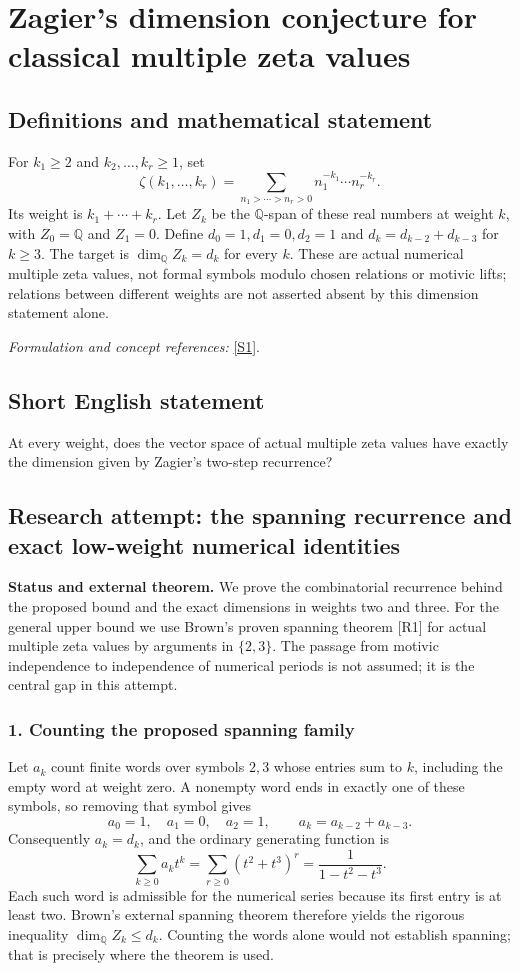 \documentclass[11pt]{article}
\begin{document}
\section*{\texorpdfstring{Zagier's dimension conjecture for classical multiple zeta values}{Zagier's dimension conjecture for classical multiple zeta values}}\label{statement}
\subsection{Definitions and mathematical statement}
For $k_1\ge2$ and $k_2,\ldots,k_r\ge1$, set
\[
 \zeta(k_1,\ldots,k_r)=\sum_{n_1>\cdots>n_r>0}
 n_1^{-k_1}\cdots n_r^{-k_r}.
\]
Its weight is $k_1+\cdots+k_r$. Let $Z_k$ be the ${\mathbb{Q}}$-span of these real numbers at weight $k$, with $Z_0={\mathbb{Q}}$ and $Z_1=0$. Define $d_0=1,d_1=0,d_2=1$ and
$d_k=d_{k-2}+d_{k-3}$ for $k\ge3$. The target is $\dim_{{\mathbb{Q}}}Z_k=d_k$ for every $k$. These are actual numerical multiple zeta values, not formal symbols modulo chosen relations or motivic lifts; relations between different weights are not asserted absent by this dimension statement alone.
\par\smallskip\textit{Formulation and concept references:} \href{https://www2.math.kyushu-u.ac.jp/~mkaneko/papers/40conjecture_dimension.pdf}{[S1]}.

\subsection{Short English statement}
At every weight, does the vector space of actual multiple zeta values have exactly the dimension given by Zagier's two-step recurrence?
\subsection{Research attempt: the spanning recurrence and exact low-weight numerical identities}
\textbf{Status and external theorem.} We prove the combinatorial recurrence behind the proposed bound and the exact dimensions in weights two and three. For the general upper bound we use Brown's proven spanning theorem [R1] for actual multiple zeta values by arguments in $\{2,3\}$. The passage from motivic independence to independence of numerical periods is not assumed; it is the central gap in this attempt.

\subsubsection{1. Counting the proposed spanning family}
Let $a_k$ count finite words over symbols $2,3$ whose entries sum to $k$, including the empty word at weight zero. A nonempty word ends in exactly one of these symbols, so removing that symbol gives
\[a_0=1,\quad a_1=0,\quad a_2=1,\qquad a_k=a_{k-2}+a_{k-3}.\]
Consequently $a_k=d_k$, and the ordinary generating function is
\[\sum_{k\ge0}a_kt^k=\sum_{r\ge0}(t^2+t^3)^r=\frac1{1-t^2-t^3}.\]
Each such word is admissible for the numerical series because its first entry is at least two. Brown's external spanning theorem therefore yields the rigorous inequality $\dim_{\mathbb Q}Z_k\le d_k$. Counting the words alone would not establish spanning; that is precisely where the theorem is used.
\end{document}
